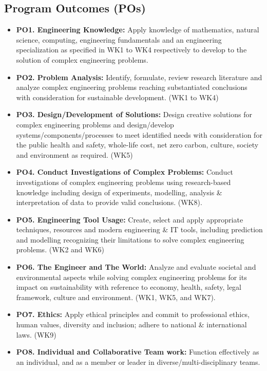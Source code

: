 \begin{center}
  \section*{Program Outcomes (POs)}
\end{center}
\justify
\begin{itemize}[label={}]
  \item \textbf{PO1. Engineering Knowledge:} Apply knowledge of mathematics, natural science, computing, engineering fundamentals and an engineering specialization as specified in WK1 to WK4 respectively to develop to the solution of complex engineering problems.
  \item \textbf{PO2. Problem Analysis:} Identify, formulate, review research literature and analyze complex engineering problems reaching substantiated conclusions with consideration for sustainable development. (WK1 to WK4)
  \item \textbf{PO3. Design/Development of Solutions:} Design creative solutions for complex engineering problems and design/develop systems/components/processes to meet identified needs with consideration for the public health and safety, whole-life cost, net zero carbon, culture, society and environment as required. (WK5)
  \item \textbf{PO4. Conduct Investigations of Complex Problems:} Conduct investigations of complex engineering problems using research-based knowledge including design of experiments, modelling, analysis \& interpretation of data to provide valid conclusions. (WK8).
  \item \textbf{PO5. Engineering Tool Usage:} Create, select and apply appropriate techniques, resources and modern engineering \& IT tools, including prediction and modelling recognizing their limitations to solve complex engineering problems. (WK2 and WK6)
  \item \textbf{PO6. The Engineer and The World:} Analyze and evaluate societal and environmental aspects while solving complex engineering problems for its impact on sustainability with reference to economy, health, safety, legal framework, culture and environment. (WK1, WK5, and WK7).
  \item \textbf{PO7. Ethics:} Apply ethical principles and commit to professional ethics, human values, diversity and inclusion; adhere to national \& international laws. (WK9)
  \item \textbf{PO8. Individual and Collaborative Team work:} Function effectively as an individual, and as a member or leader in diverse/multi-disciplinary teams.

\end{itemize}
